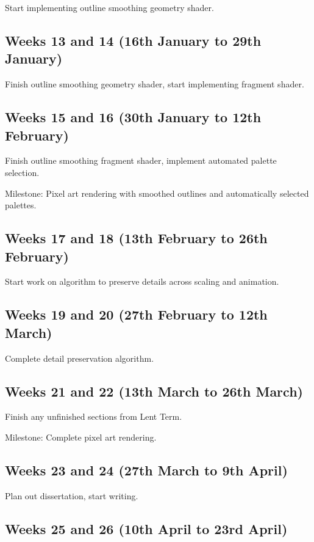 \documentclass[12pt]{article}
\begin{document}
Start implementing outline smoothing geometry shader.

\subsection*{Weeks 13 and 14 (16th January to 29th January)}

Finish outline smoothing geometry shader, start implementing fragment shader.

\subsection*{Weeks 15 and 16 (30th January to 12th February)}

Finish outline smoothing fragment shader, implement automated palette selection.

Milestone: Pixel art rendering with smoothed outlines and automatically selected palettes.

\subsection*{Weeks 17 and 18 (13th February to 26th February)}

Start work on algorithm to preserve details across scaling and animation.

\subsection*{Weeks 19 and 20 (27th February to 12th March)}

Complete detail preservation algorithm.

\subsection*{Weeks 21 and 22 (13th March to 26th March)}

Finish any unfinished sections from Lent Term.

Milestone: Complete pixel art rendering.

\subsection*{Weeks 23 and 24 (27th March to 9th April)}

Plan out dissertation, start writing.

\subsection*{Weeks 25 and 26 (10th April to 23rd April)}
\end{document}
